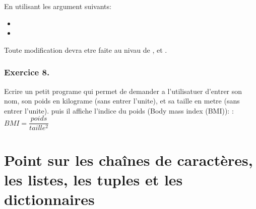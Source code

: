 \documentclass[letterpaper,10pt,french]{sphinxmanual}
\begin{document}
\begin{sphinxVerbatim}[commandchars=\\\{\}]
     
\end{sphinxVerbatim}

\sphinxAtStartPar
En utilisant les argument suivants:
\begin{itemize}
\item {} 
\sphinxAtStartPar
{}

\item {} 
\sphinxAtStartPar
{}

\end{itemize}

\sphinxAtStartPar
Toute modification devra etre faite au nivau de , et .

\begin{sphinxVerbatim}[commandchars=\\\{\}]
\end{sphinxVerbatim}




\subsection{Exercice 8.}
\label{\detokenize{exo2:exercice-8}}
\sphinxAtStartPar
Ecrire un petit programe qui permet de demander a l’utilisatuer d’entrer son nom, son poids en kilograme (sans entrer l’unite), et sa taille en metre (sans entrer l’unite). puis il affiche l’indice du poids (Body mass index (BMI)):
: \(BMI = \dfrac{poids}{taille^2}\)

\begin{sphinxVerbatim}[commandchars=\\\{\}]
\end{sphinxVerbatim}


\chapter{Point sur les chaînes de caractères, les listes, les tuples et les dictionnaires}
\label{\detokenize{content3:point-sur-les-chaines-de-caracteres-les-listes-les-tuples-et-les-dictionnaires}}\label{\detokenize{content3::doc}}
\end{document}

